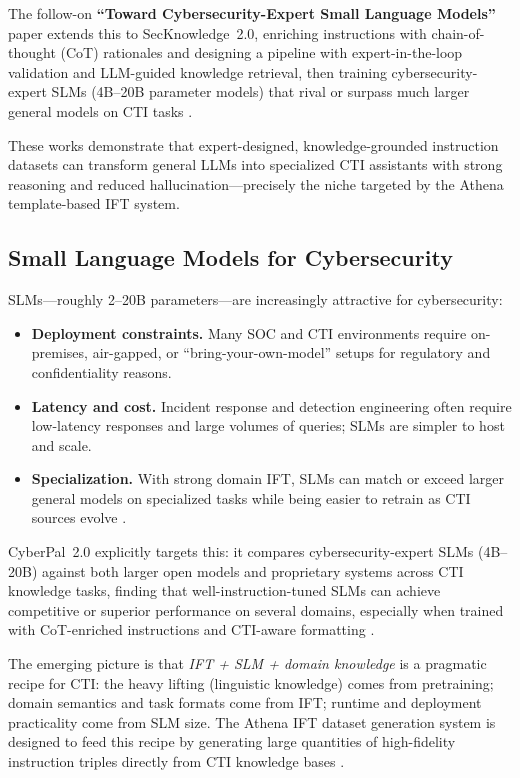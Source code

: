 \documentclass[unnumsec,webpdf,contemporary,large]{oup-authoring-template}
\theoremstyle{thmstyleone}
\theoremstyle{thmstyletwo}
\theoremstyle{thmstylethree}
\begin{document}
The follow-on \textbf{``Toward Cybersecurity-Expert Small Language Models''} paper extends this to SecKnowledge~2.0, enriching instructions with chain-of-thought (CoT) rationales and designing a pipeline with expert-in-the-loop validation and LLM-guided knowledge retrieval, then training cybersecurity-expert SLMs (4B--20B parameter models) that rival or surpass much larger general models on CTI tasks \cite{levi2025toward}.

These works demonstrate that expert-designed, knowledge-grounded instruction datasets can transform general LLMs into specialized CTI assistants with strong reasoning and reduced hallucination---precisely the niche targeted by the Athena template-based IFT system.

\subsection{Small Language Models for Cybersecurity}

SLMs---roughly 2--20B parameters---are increasingly attractive for cybersecurity:

\begin{itemize}
  \item \textbf{Deployment constraints.} Many SOC and CTI environments require on-premises, air-gapped, or ``bring-your-own-model'' setups for regulatory and confidentiality reasons.
  \item \textbf{Latency and cost.} Incident response and detection engineering often require low-latency responses and large volumes of queries; SLMs are simpler to host and scale.
  \item \textbf{Specialization.} With strong domain IFT, SLMs can match or exceed larger general models on specialized tasks while being easier to retrain as CTI sources evolve \cite{levi2025toward}.
\end{itemize}

CyberPal~2.0 explicitly targets this: it compares cybersecurity-expert SLMs (4B--20B) against both larger open models and proprietary systems across CTI knowledge tasks, finding that well-instruction-tuned SLMs can achieve competitive or superior performance on several domains, especially when trained with CoT-enriched instructions and CTI-aware formatting \cite{levi2025toward}.

The emerging picture is that \emph{IFT + SLM + domain knowledge} is a pragmatic recipe for CTI: the heavy lifting (linguistic knowledge) comes from pretraining; domain semantics and task formats come from IFT; runtime and deployment practicality come from SLM size. The Athena IFT dataset generation system is designed to feed this recipe by generating large quantities of high-fidelity instruction triples directly from CTI knowledge bases \cite{cardei2025ift}.
\end{document}
